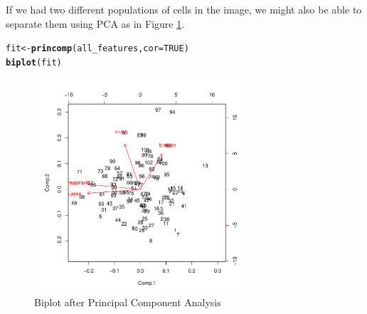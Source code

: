 \documentclass{article}\usepackage[]{graphicx}\usepackage[]{color}
\makeatletter
\newcommand{\hlnum}[1]{\textcolor[rgb]{0.686,0.059,0.569}{#1}}%
\newcommand{\hlstd}[1]{\textcolor[rgb]{0.345,0.345,0.345}{#1}}%
\newcommand{\hlkwb}[1]{\textcolor[rgb]{0.69,0.353,0.396}{#1}}%
\newcommand{\hlkwc}[1]{\textcolor[rgb]{0.333,0.667,0.333}{#1}}%
\newcommand{\hlkwd}[1]{\textcolor[rgb]{0.737,0.353,0.396}{\textbf{#1}}}%
\newenvironment{kframe}{%
 \def\at@end@of@kframe{}%
 \ifinner\ifhmode%
  \def\at@end@of@kframe{\end{minipage}}%
  \begin{minipage}{\columnwidth}%
 \fi\fi%
 \def\FrameCommand##1{\hskip\@totalleftmargin \hskip-\fboxsep
 \colorbox{shadecolor}{##1}\hskip-\fboxsep
     \hskip-\linewidth \hskip-\@totalleftmargin \hskip\columnwidth}%
 \MakeFramed {\advance\hsize-\width
   \@totalleftmargin\z@ \linewidth\hsize
   \@setminipage}}%
 {\par\unskip\endMakeFramed%
 \at@end@of@kframe}
\newenvironment{knitrout}{}{} %
\makeatother
\begin{document}
If we had two different populations of cells in the image, we might also be able to separate them using PCA as in Figure \ref{fig:pca}.
\begin{knitrout}
\color{fgcolor}\begin{kframe}
\begin{alltt}
\hlstd{fit} \hlkwb{<-} \hlkwd{princomp}\hlstd{(all_features,} \hlkwc{cor}\hlstd{=}\hlnum{TRUE}\hlstd{)}
\hlkwd{biplot}\hlstd{(fit)}
\end{alltt}
\end{kframe}\begin{figure}

{\centering \includegraphics[width=300px]{knit_figure/figpca-1} 

}

\caption[Biplot after Principal Component Analysis]{Biplot after Principal Component Analysis}\label{fig:pca}
\end{figure}


\end{knitrout}
\end{document}
